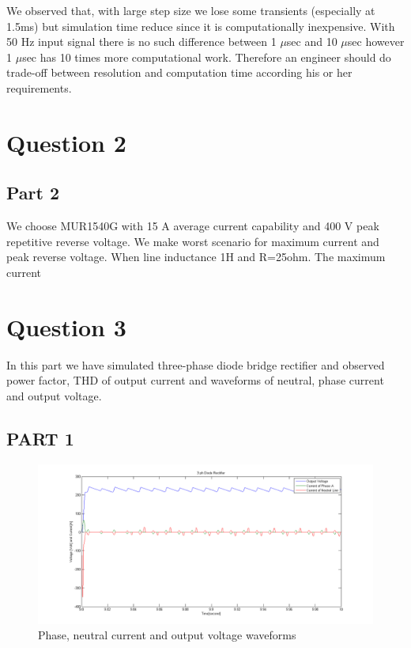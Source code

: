 \documentclass[fleqn, a4paper]{article}
\begin{document}
We observed that, with large step size we lose some transients (especially at 1.5ms) but simulation time reduce since it is computationally inexpensive. With 50 Hz input signal there is no such difference between 1 $\mu$sec and 10 $\mu$sec however 1 $\mu$sec has 10 times more computational work. Therefore an engineer should do trade-off between resolution and computation time according his or her requirements.  
\section*{Question 2}
\subsection*{Part 2}
We choose MUR1540G with 15 A average current capability and 400 V peak repetitive reverse voltage. We make worst scenario for maximum current and peak reverse voltage. 
When line inductance 1H and R=25ohm. The maximum current 

\section*{Question 3}
In this part we have simulated three-phase diode bridge rectifier and observed power factor, THD of output current and waveforms of neutral, phase current and output voltage.
\subsection{PART 1}
\begin{figure}[H]
  \includegraphics[width=\linewidth]{A3_1.png}
  \caption{Phase, neutral current and output voltage waveforms}
  \label{fig:simulink3}
\end{figure}
\end{document}
